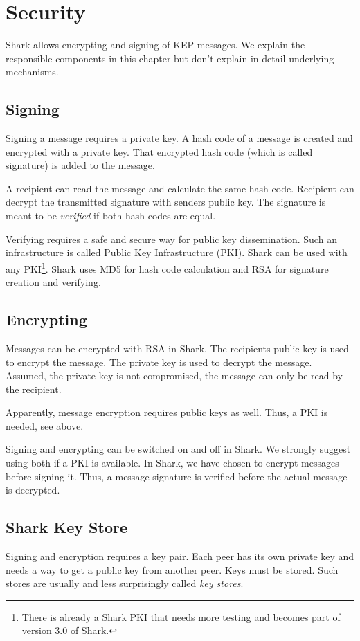 \chapter{Security}
\label{sec:security}
Shark allows encrypting and signing of KEP messages. We explain the responsible components in this chapter but don't explain in detail underlying mechanisms.

\section{Signing}
Signing a message requires a private key. A hash code of a message is created and encrypted with a private key. That encrypted hash code (which is called signature) is added to the message.

A recipient can read the message and calculate the same hash code. Recipient can decrypt the transmitted signature with senders public key. The signature is meant to be {\it verified} if both hash codes are equal.

Verifying requires a safe and secure way for public key dissemination. Such an infrastructure is called Public Key Infrastructure (PKI). Shark can be used with any PKI\footnote{There is already a Shark PKI that needs more testing and becomes part of version 3.0 of Shark.}. Shark uses MD5 for hash code calculation and RSA for signature creation and verifying.

\section{Encrypting}
Messages can be encrypted with RSA in Shark. The recipients public key is used to encrypt the message. The private key is used to decrypt the message. Assumed, the private key is not compromised, the message can only be read by the recipient.

Apparently, message encryption requires public keys as well. Thus, a PKI is needed, see above.

Signing and encrypting can be switched on and off in Shark. We strongly suggest using both if a PKI is available. In Shark, we have chosen to encrypt messages before signing it. Thus, a message signature is verified before the 
actual message is decrypted.

\section{Shark Key Store}
Signing and encryption requires a key pair. Each peer has its own private key and needs a way to get a public key from another peer. Keys must be stored. Such stores are usually and less surprisingly called {\it key stores}.

